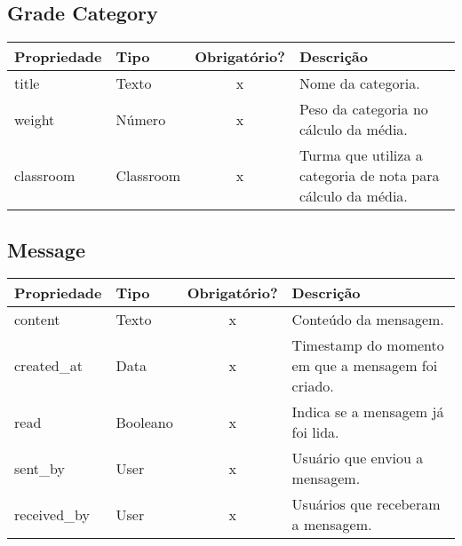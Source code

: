 \subsection{Grade Category} \label{Grade Category}
\begin{table}[H]
	\footnotesize
	\begin{tabularx}{\textwidth}{|X|X|c|p{7.8cm}|}   \hline \rowcolor[rgb]{0.8,0.8,0.8}
		
		\textbf{Propriedade} & \textbf{Tipo} & \textbf{Obrigatório?} & \centerline{\textbf{Descrição}} \\\hline  	
		
		title & Texto & x & Nome da categoria. \\\hline		
		weight & Número & x & Peso da categoria no cálculo da média. \\\hline	
		classroom & Classroom & x & Turma que utiliza a categoria de nota para cálculo da média. \\\hline
		
	\end{tabularx}	
\end{table}


\subsection{Message} \label{Message}
\begin{table}[H]
	\footnotesize
	\begin{tabularx}{\textwidth}{|X|X|c|p{7.8cm}|}   \hline \rowcolor[rgb]{0.8,0.8,0.8}
		
		\textbf{Propriedade} & \textbf{Tipo} & \textbf{Obrigatório?} & \centerline{\textbf{Descrição}} \\\hline  	
		
		content & Texto & x & Conteúdo da mensagem. \\\hline		
		created\_at & Data & x & Timestamp do momento em que a mensagem foi criado. \\\hline
		read & Booleano & x & Indica se a mensagem já foi lida. \\\hline
		sent\_by & User & x & Usuário que enviou a mensagem. \\\hline
		received\_by & User & x & Usuários que receberam a mensagem. \\\hline
		
	\end{tabularx}	
\end{table}

